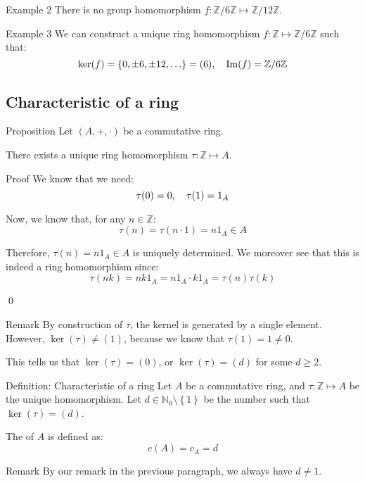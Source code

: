 \documentclass[a4paper]{article}
\begin{document}
\begin{parag}{Example 2}
    There is no group homomorphism $f: \mathbb{Z}/6\mathbb{Z} \mapsto \mathbb{Z}/12\mathbb{Z}$.
\end{parag}

\begin{parag}{Example 3}
    We can construct a unique ring homomorphism $f: \mathbb{Z} \mapsto \mathbb{Z}/6\mathbb{Z}$ such that: 
    \[\ker\left(f\right) = \left\{0, \pm6, \pm12, \ldots\right\} = \left(6\right), \mathspace \im\left(f\right) = \mathbb{Z}/6\mathbb{Z}\]
\end{parag}


\subsection{Characteristic of a ring}

\begin{parag}{Proposition}
    Let $\left(A, +, \cdot \right)$ be a commutative ring.

    There exists a unique ring homomorphism $\tau: \mathbb{Z} \mapsto A$.

    \begin{subparag}{Proof}
        We know that we need: 
        \[\tau\left(0\right) = 0, \mathspace \tau\left(1\right) = 1_A\]
        
        Now, we know that, for any $n \in \mathbb{Z}$: 
        \[\tau\left(n\right) = \tau\left(n\cdot 1\right) = n 1_A \in A\]
        
        Therefore, $\tau\left(n\right) = n 1_A \in A$ is uniquely determined. We moreover see that this is indeed a ring homomorphism since: 
        \[\tau\left(nk\right) = nk 1_A = n 1_A \cdot  k 1_A= \tau\left(n\right)\tau\left(k\right)\]

        \qed
    \end{subparag}

    \begin{subparag}{Remark}
        By construction of $\tau$, the kernel is generated by a single element. However, $\ker\left(\tau\right) \neq \left(1\right)$, because we know that $\tau\left(1\right) = 1 \neq 0$. 

        This tells us that $\ker\left(\tau\right) = \left(0\right)$, or $\ker\left(\tau\right) = \left(d\right)$ for some $d \geq 2$.
    \end{subparag}
\end{parag}

\begin{parag}{Definition: Characteristic of a ring}
    Let $A$ be a commutative ring, and $\tau : \mathbb{Z} \mapsto A$ be the unique homomorphism. Let $d \in \mathbb{N}_0 \setminus \left\{1\right\}$ be the number such that $\ker\left(\tau\right) = \left(d\right)$.

    The  of $A$ is defined as: 
    \[c\left(A\right) = c_A = d\]

    \begin{subparag}{Remark}
        By our remark in the previous paragraph, we always have $d \neq 1$.
    \end{subparag}
\end{parag}
\end{document}
